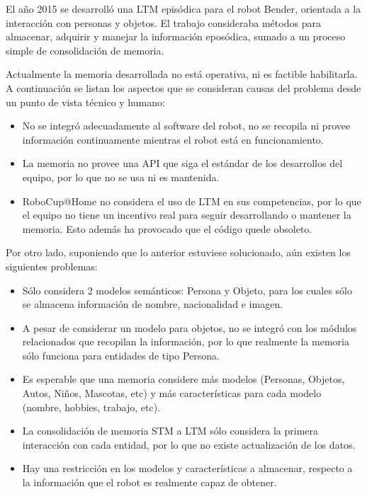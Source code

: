 El a\~no 2015 se desarroll\'o una LTM epis\'odica para el robot Bender, orientada a la interacci\'on con personas y objetos\cite{Sanchez:2015}. El trabajo consideraba m\'etodos para almacenar, adquirir y manejar la informaci\'on epos\'odica, sumado a un proceso simple de consolidaci\'on de memoria.

Actualmente la memoria desarrollada no est\'a operativa, ni es factible habilitarla. A continuaci\'on se listan los aspectos que se consideran causas del problema desde un punto de vista t\'ecnico y humano:
\begin{itemize}
\item No se integr\'o adecuadamente al software del robot, no se recopila ni provee informaci\'on continuamente mientras el robot est\'a en funcionamiento.
\item La memoria no provee una API que siga el est\'andar de los desarrollos del equipo, por lo que no se usa ni es mantenida.
\item RoboCup@Home no considera el uso de LTM en sus competencias, por lo que el equipo no tiene un incentivo real para seguir desarrollando o mantener la memoria. Esto adem\'as ha provocado que el c\'odigo quede obsoleto.
\end{itemize}

Por otro lado, suponiendo que lo anterior estuviese solucionado, a\'un existen los siguientes problemas:
\begin{itemize}
\item S\'olo considera 2 modelos sem\'anticos: Persona y Objeto, para los cuales s\'olo se almacena informaci\'on de nombre, nacionalidad e imagen.
\item A pesar de considerar un modelo para objetos, no se integr\'o con los m\'odulos relacionados que recopilan la informaci\'on, por lo que realmente la memoria s\'olo funciona para entidades de tipo Persona.
\item Es esperable que una memoria considere m\'as modelos (Personas, Objetos, Autos, Ni\~nos, Mascotas, etc) y m\'as caracter\'isticas para cada modelo (nombre, hobbies, trabajo, etc).
\item La consolidaci\'on de memoria STM a LTM s\'olo considera la primera interacci\'on con cada entidad, por lo que no existe actualizaci\'on de los datos.
\item Hay una restricci\'on en los modelos y caracter\'isticas a almacenar, respecto a la informaci\'on que el robot es realmente capaz de obtener.
\end{itemize}


